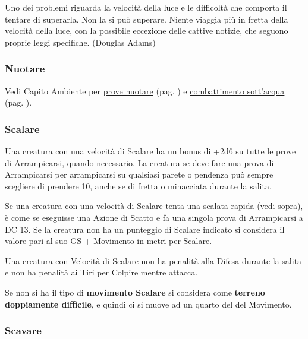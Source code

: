 \begin{multicols}{2}
\begin{changemargin}{0.3cm}{0.3cm}\begin{enfasi}{
Uno dei problemi riguarda la velocità della luce e le difficoltà che comporta il tentare di superarla. Non la si può superare. Niente viaggia più in fretta della velocità della luce, con la possibile eccezione delle cattive notizie, che seguono proprie leggi specifiche. (Douglas Adams)
}\end{enfasi}\end{changemargin}

\label{altri-tipi-di-movimento}

\subsubsection{Nuotare}\label{nuotare}

Vedi Capito Ambiente per \hyperlink{pericoli-dellacqua}{prove nuotare} (pag. \pageref{pericoli-dellacqua}) e \hyperlink{combatteresottacqua}{combattimento sott'acqua} (pag. \pageref{combatteresottacqua}).

\subsubsection{Scalare}\label{scalare}

Una creatura con una velocità di Scalare ha un bonus di +2d6 su tutte le prove di Arrampicarsi, quando necessario. La creatura se deve fare una prova di Arrampicarsi per arrampicarsi su qualsiasi parete o pendenza può sempre scegliere di prendere 10, anche se di fretta o minacciata durante la salita.

Se una creatura con una velocità di Scalare tenta una scalata rapida (vedi sopra), è come se eseguisse una Azione di Scatto e fa una singola prova di Arrampicarsi a DC 13. Se la creatura non ha un punteggio di Scalare indicato si considera il valore pari al suo GS + Movimento in metri per Scalare.

Una creatura con Velocità di Scalare non ha penalità alla Difesa durante la salita e non ha penalità ai Tiri per Colpire mentre attacca.

Se non si ha il tipo di \textbf{movimento Scalare} si considera come \textbf{terreno doppiamente difficile}, e quindi ci si muove ad un quarto del del Movimento.

\subsubsection{Scavare}\label{scavare}


\end{multicols}
